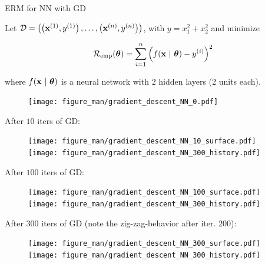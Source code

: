 \documentclass[11pt,compress,t,notes=noshow, xcolor=table]{beamer}
\begin{document}
\begin{vbframe}{ERM for NN with GD}

Let $\mathcal{D} = \left( \left(\mathbf{x}^{(1)}, y^{(1)}\right), \ldots, \left(\mathbf{x}^{(n)}, y^{(n)}\right)\right)$, with $y = x_1^2 + x_2^2$ and minimize 

\vspace*{-0.3cm}

$$
	\mathcal{R}_{\text{emp}}(\bm{\theta}) = \sum\limits_{i=1}^n \left(f(\mathbf{x} ~|~ \bm{\theta}) - y^{(i)}\right)^2
$$

\vspace*{-0.1cm}

where $f(\mathbf{x} ~|~ \bm{\theta})$ is a neural network with 2 hidden layers (2 units each). 

\vspace*{-1.5cm}

\begin{figure}
	\texttt{[image: figure\_man/gradient\_descent\_NN\_0.pdf]}
\end{figure}

\framebreak 

After $10$ iters of GD: 

\begin{figure}
	\texttt{[image: figure\_man/gradient\_descent\_NN\_10\_surface.pdf]} ~~ \texttt{[image: figure\_man/gradient\_descent\_NN\_300\_history.pdf]}
\end{figure}

\framebreak 

After $100$ iters of GD: 

\begin{figure}
	\texttt{[image: figure\_man/gradient\_descent\_NN\_100\_surface.pdf]} ~~ \texttt{[image: figure\_man/gradient\_descent\_NN\_300\_history.pdf]}
\end{figure}

\framebreak 

After $300$ iters of GD (note the zig-zag-behavior after iter. 200):

\begin{figure}
	\texttt{[image: figure\_man/gradient\_descent\_NN\_300\_surface.pdf]} ~~ \texttt{[image: figure\_man/gradient\_descent\_NN\_300\_history.pdf]}
\end{figure}
\end{vbframe}
\end{document}
